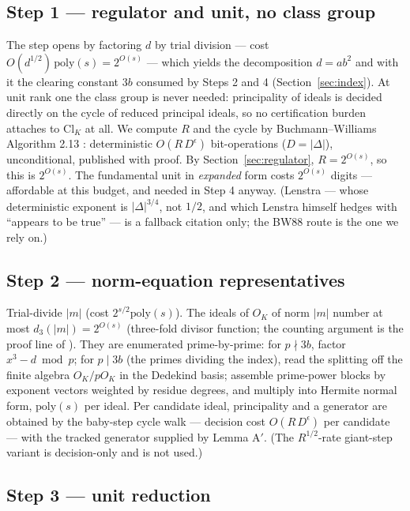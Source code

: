 \documentclass[11pt]{amsart}
\theoremstyle{plain}
\theoremstyle{remark}
\begin{document}
\subsection{Step 1 --- regulator and unit, no class group}
\label{sec:step1}

The step opens by factoring $d$ by trial division --- cost
$O(d^{1/2})\,\mathrm{poly}(s) = 2^{O(s)}$ --- which yields the
decomposition $d = ab^2$ and with it the clearing constant $3b$
consumed by Steps 2 and 4 (Section~\ref{sec:index}). At unit rank one
the class group is never needed: principality of
ideals is decided directly on the cycle of reduced principal ideals,
so no certification burden attaches to $\mathrm{Cl}_K$ at all. We
compute $R$ and the cycle by Buchmann--Williams Algorithm 2.13
\cite[Prop.~2.14]{BW88}: deterministic $O(R\,D^{\epsilon})$
bit-operations ($D = |\Delta|$), unconditional, published with proof.
By Section~\ref{sec:regulator}, $R = 2^{O(s)}$, so this is $2^{O(s)}$.
The fundamental unit in \emph{expanded} form costs $2^{O(s)}$ digits
--- affordable at this budget, and needed in Step 4 anyway. (Lenstra
\cite[Thm.~5.5]{Len92} --- whose deterministic exponent is
$|\Delta|^{3/4}$, not $1/2$, and which Lenstra himself hedges with
``appears to be true'' --- is a fallback citation only; the BW88 route
is the one we rely on.)

\subsection{Step 2 --- norm-equation representatives}\label{sec:step2}

Trial-divide $|m|$ (cost $2^{s/2}\mathrm{poly}(s)$). The ideals of
$O_K$ of norm $|m|$ number at most $d_3(|m|) = 2^{O(s)}$ (three-fold
divisor function; the counting argument is the proof line of
\cite[Thm.~6.5]{Len92}). They are enumerated prime-by-prime: for
$p \nmid 3b$, factor $x^3 - d \bmod p$; for $p \mid 3b$ (the primes
dividing the index), read the splitting off the finite algebra
$O_K/pO_K$ in the Dedekind basis; assemble prime-power blocks by
exponent vectors weighted by residue degrees, and multiply into
Hermite normal form, $\mathrm{poly}(s)$ per ideal. Per candidate
ideal, principality and a generator are obtained by the baby-step
cycle walk --- decision cost $O(R\,D^\epsilon)$ per candidate
\cite[Prop.~4.5]{BW88} --- with the tracked generator supplied by
Lemma A$'$. (The $R^{1/2}$-rate giant-step variant
\cite[Thm.~4.7]{BW88} is decision-only and is not used.)

\subsection{Step 3 --- unit reduction}\label{sec:step3}
\end{document}
